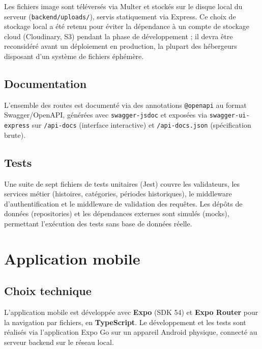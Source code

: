 \documentclass[11pt,a4paper]{article}
\begin{document}
Les fichiers image sont téléversés via Multer et stockés sur le disque local du serveur (\texttt{backend/uploads/}), servis statiquement via Express. Ce choix de stockage local a été retenu pour éviter la dépendance à un compte de stockage cloud (Cloudinary, S3) pendant la phase de développement ; il devra être reconsidéré avant un déploiement en production, la plupart des hébergeurs disposant d'un système de fichiers éphémère.

\subsection{Documentation}

L'ensemble des routes est documenté via des annotations \texttt{@openapi} au format Swagger/OpenAPI, générées avec \texttt{swagger-jsdoc} et exposées via \texttt{swagger-ui-express} sur \texttt{/api-docs} (interface interactive) et \texttt{/api-docs.json} (spécification brute).

\subsection{Tests}

Une suite de sept fichiers de tests unitaires (Jest) couvre les validateurs, les services métier (histoires, catégories, périodes historiques), le middleware d'authentification et le middleware de validation des requêtes. Les dépôts de données (repositories) et les dépendances externes sont simulés (mocks), permettant l'exécution des tests sans base de données réelle.

\section{Application mobile}

\subsection{Choix technique}

L'application mobile est développée avec \textbf{Expo} (SDK 54) et \textbf{Expo Router} pour la navigation par fichiers, en \textbf{TypeScript}. Le développement et les tests sont réalisés via l'application Expo Go sur un appareil Android physique, connecté au serveur backend sur le réseau local.
\end{document}
